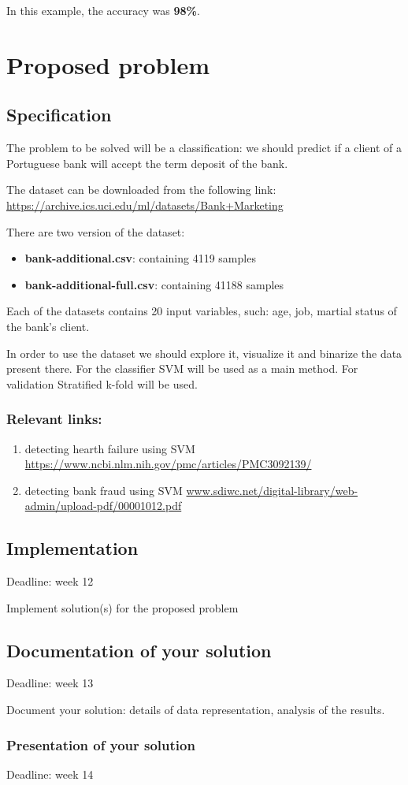 \documentclass[a4paper,10pt]{article}
\begin{document}
 
 
 In this example, the accuracy was \textbf{98\%}.
 
 \section{Proposed problem}
  \subsection{Specification} 
  
  The problem to be solved will be a classification: we should predict if a client of a Portuguese bank will
  accept the term deposit of the bank. 
  
  The dataset can be downloaded from the following link: 
  \url{https://archive.ics.uci.edu/ml/datasets/Bank+Marketing}
  
  There are two version of the dataset:
  \begin{itemize}
  \item \textbf{bank-additional.csv}: containing 4119 samples
  \item \textbf{bank-additional-full.csv}: containing 41188 samples
  \end{itemize}
  
  Each of the datasets contains 20 input variables, such: age, job, martial status of the bank's client.
  
    
  In order to use the dataset we should explore it, visualize it and binarize the data present there.
  For the classifier SVM will be used as a main method.
  For validation Stratified k-fold will be used.
  
  \subsubsection{Relevant links:}
  \begin{enumerate}
  \item detecting hearth failure using SVM \url{https://www.ncbi.nlm.nih.gov/pmc/articles/PMC3092139/}
  \item detecting bank fraud using SVM \url{www.sdiwc.net/digital-library/web-admin/upload-pdf/00001012.pdf}
  \end{enumerate}

  
  
  \subsection{Implementation} 
  Deadline:  week  12
  
 Implement solution(s) for the proposed problem

  \subsection{Documentation of your solution}
  Deadline: week 13
  
  Document your solution: details of data representation, analysis of the results.
  
  \subsubsection{Presentation of your solution}
Deadline: week 14
\end{document}

